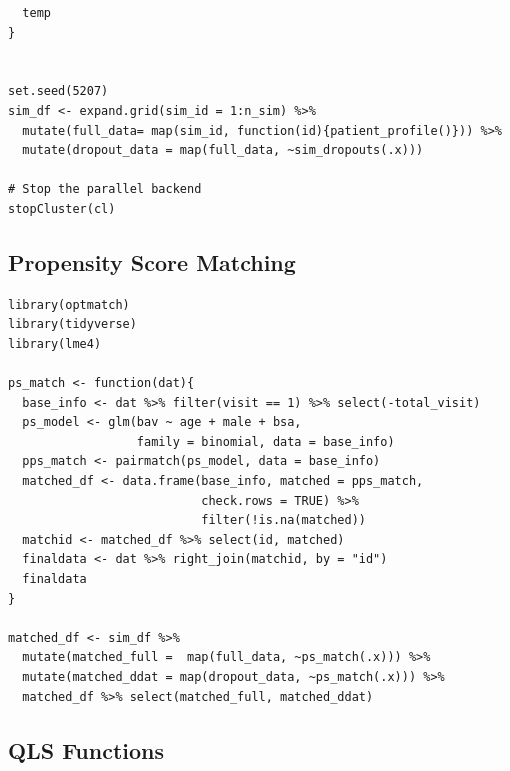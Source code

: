 \documentclass[
]{aft}
\begin{document}
\begin{verbatim}
  temp 
}


set.seed(5207)
sim_df <- expand.grid(sim_id = 1:n_sim) %>%
  mutate(full_data= map(sim_id, function(id){patient_profile()})) %>%
  mutate(dropout_data = map(full_data, ~sim_dropouts(.x))) 

# Stop the parallel backend
stopCluster(cl)
\end{verbatim}

\subsection{Propensity Score Matching}\label{propensity-score-matching}

\begin{verbatim}
library(optmatch)
library(tidyverse)
library(lme4)

ps_match <- function(dat){
  base_info <- dat %>% filter(visit == 1) %>% select(-total_visit)
  ps_model <- glm(bav ~ age + male + bsa, 
                  family = binomial, data = base_info)
  pps_match <- pairmatch(ps_model, data = base_info)
  matched_df <- data.frame(base_info, matched = pps_match, 
                           check.rows = TRUE) %>% 
                           filter(!is.na(matched))
  matchid <- matched_df %>% select(id, matched)
  finaldata <- dat %>% right_join(matchid, by = "id")
  finaldata
}

matched_df <- sim_df %>% 
  mutate(matched_full =  map(full_data, ~ps_match(.x))) %>% 
  mutate(matched_ddat = map(dropout_data, ~ps_match(.x))) %>% 
  matched_df %>% select(matched_full, matched_ddat)
\end{verbatim}

\newpage

\subsection{QLS Functions}\label{qls-functions}
\end{document}
